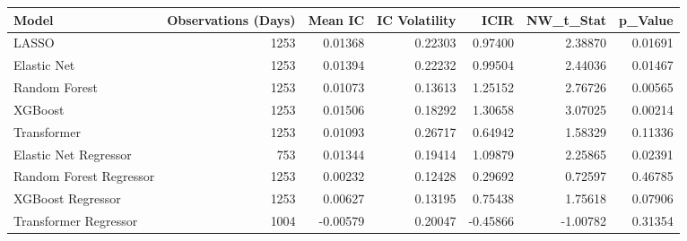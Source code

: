 \begin{tabular}{lrrrrrr}
\toprule
Model & Observations (Days) & Mean IC & IC Volatility & ICIR & NW_t_Stat & p_Value \\
\midrule
LASSO & 1253 & 0.01368 & 0.22303 & 0.97400 & 2.38870 & 0.01691 \\
Elastic Net & 1253 & 0.01394 & 0.22232 & 0.99504 & 2.44036 & 0.01467 \\
Random Forest & 1253 & 0.01073 & 0.13613 & 1.25152 & 2.76726 & 0.00565 \\
XGBoost & 1253 & 0.01506 & 0.18292 & 1.30658 & 3.07025 & 0.00214 \\
Transformer & 1253 & 0.01093 & 0.26717 & 0.64942 & 1.58329 & 0.11336 \\
Elastic Net Regressor & 753 & 0.01344 & 0.19414 & 1.09879 & 2.25865 & 0.02391 \\
Random Forest Regressor & 1253 & 0.00232 & 0.12428 & 0.29692 & 0.72597 & 0.46785 \\
XGBoost Regressor & 1253 & 0.00627 & 0.13195 & 0.75438 & 1.75618 & 0.07906 \\
Transformer Regressor & 1004 & -0.00579 & 0.20047 & -0.45866 & -1.00782 & 0.31354 \\
\bottomrule
\end{tabular}
